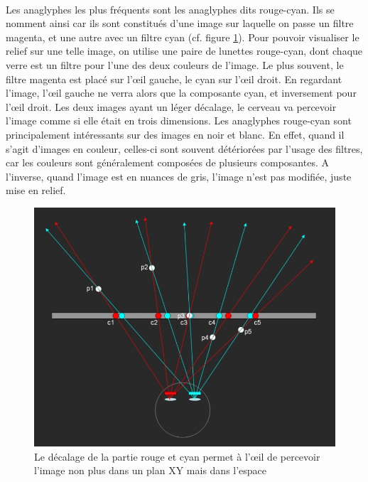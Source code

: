 \paragraph{}
	Les anaglyphes les plus fréquents sont les anaglyphes dits rouge-cyan. Ils se nomment ainsi car ils sont constitués d’une image sur laquelle on passe un filtre magenta, et une autre avec un filtre cyan (cf. figure \ref{fig:anaglyph}). Pour pouvoir visualiser le relief sur une telle image, on utilise une paire de lunettes rouge-cyan, dont chaque verre est un filtre pour l’une des deux couleurs de l’image. Le plus souvent, le filtre magenta est placé sur l’œil gauche, le cyan sur l’œil droit. En regardant l’image, l’œil gauche ne verra alors que la composante cyan, et inversement pour l’œil droit. Les deux images ayant un léger décalage, le cerveau va percevoir l’image comme si elle était en trois dimensions. Les anaglyphes rouge-cyan sont principalement intéressants sur des images en noir et blanc. En effet, quand il s’agit d’images en couleur, celles-ci sont souvent détériorées par l’usage des filtres, car les couleurs sont généralement composées de plusieurs composantes. A l’inverse, quand l’image est en nuances de gris, l’image n’est pas modifiée, juste mise en relief.

\begin{figure}[h]
		\centering
		\includegraphics[scale=1]{anaglyph.png}
		\caption{\label{fig:anaglyph} Le décalage de la partie rouge et cyan permet à l’œil de percevoir l’image non plus dans un plan XY mais dans l’espace \protect \footnotemark }
\end{figure}


